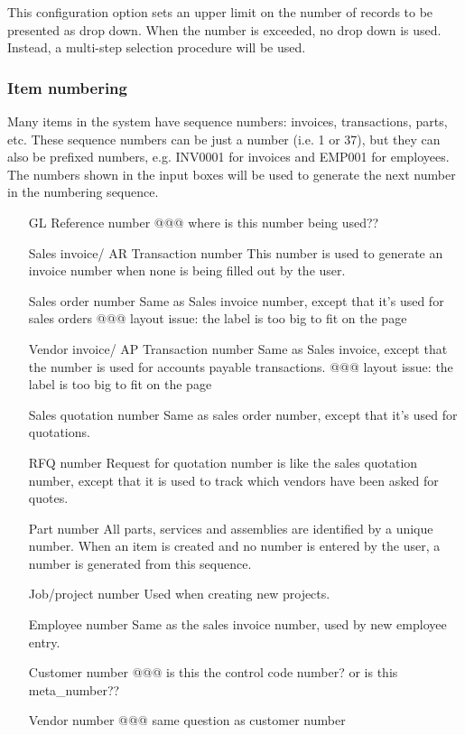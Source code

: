 This configuration option sets an upper limit on the number of records to be
presented as drop down.  When the number is exceeded, no drop down is used.  Instead,
a multi-step selection procedure will be used.

\subsubsection{Item numbering}
\label{sec:DefaultsItemNumbering}

Many items in the system have sequence numbers: invoices, transactions, parts, etc. These sequence numbers can be just a number (i.e. 1 or 37),
but they can also be prefixed numbers, e.g. INV0001 for invoices and EMP001 for employees.
The numbers shown in the input boxes will be used to generate the next number in the
numbering sequence.
\begin{itemize}
\item [GL Reference number] @@@ where is this number being used??
\item [Sales invoice/ AR Transaction number] This number is used to generate an invoice
number when none is being filled out by the user.
\item [Sales order number] Same as Sales invoice number, except that it's used for sales orders @@@ layout issue: the label is too big to fit on the page
\item [Vendor invoice/ AP Transaction number] Same as Sales invoice, except that the number
is used for accounts payable transactions. @@@ layout issue: the label is too big to fit on the page
\item [Sales quotation number] Same as sales order number, except that it's used for quotations.
\item [RFQ number] Request for quotation number is like the sales quotation number, except
that it is used to track which vendors have been asked for quotes.
\item [Part number] All parts, services and assemblies are identified by a unique number.
When an item is created and no number is entered by the user, a number is generated
from this sequence.
\item [Job/project number] Used when creating new projects.
\item [Employee number] Same as the sales invoice number, used by new employee entry.
\item [Customer number] @@@ is this the control code number? or is this meta\_number??
\item [Vendor number] @@@ same question as customer number
\end{itemize}

